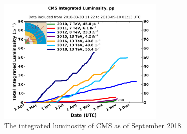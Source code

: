 \begin{figure}
\centering
\includegraphics[width=0.7\textwidth]{figs/int_lumi_cumulative_pp_2.pdf}
\caption{The integrated luminosity of CMS as of September 2018.}
\label{fig:lumi}
\end{figure}
